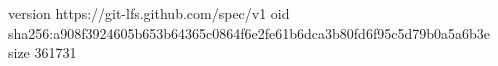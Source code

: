 version https://git-lfs.github.com/spec/v1
oid sha256:a908f3924605b653b64365c0864f6e2fe61b6dca3b80fd6f95c5d79b0a5a6b3e
size 361731
